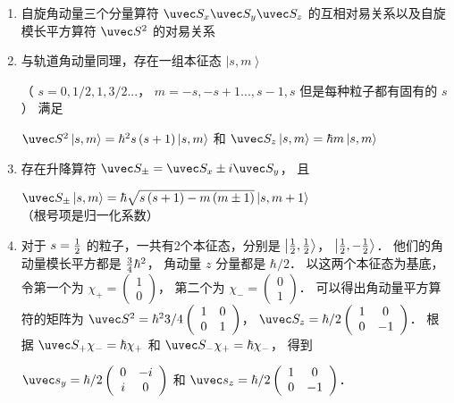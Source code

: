 
\begin{enumerate}
\item 自旋角动量三个分量算符 ${\uvec S_x}{\uvec S_y}{\uvec S_z}$ 的互相对易关系以及自旋模长平方算符 ${\uvec S^2}$ 的对易关系 %
\item 与轨道角动量同理，存在一组本征态 $\left| {s,m} \right\rangle $ 

（ $s = 0,{1}/{2},1,{3}/{2}...$， $m =  - s, - s + 1...,s - 1,s$ 但是每种粒子都有固有的 $s$ ） 满足

 ${\uvec S^2}\left| {s,m} \right\rangle  = {\hbar ^2}s\left( {s + 1} \right)\left| {s,m} \right\rangle $ 和 ${\uvec S_z}\left| {s,m} \right\rangle  = \hbar m\left| {s,m} \right\rangle $
\item 存在升降算符 ${\uvec S_ \pm } = {\uvec S_x} \pm i{\uvec S_y}$， 且

 ${\uvec S_ \pm }\left| {s,m} \right\rangle  = \hbar \sqrt {s\left( {s + 1} \right) - m\left( {m \pm 1} \right)} \left| {s,m + 1} \right\rangle $ （根号项是归一化系数）
\item 对于 $s = {\textstyle{1 \over 2}}$ 的粒子，一共有2个本征态，分别是 $\left| {{\textstyle{1 \over 2}},{\textstyle{1 \over 2}}} \right\rangle $，  $\left| {{\textstyle{1 \over 2}}, - {\textstyle{1 \over 2}}} \right\rangle $． 他们的角动量模长平方都是 ${\textstyle{3 \over 4}}{\hbar ^2}$， 角动量 $z$ 分量都是 ${\hbar }/{2}$．  以这两个本征态为基底，令第一个为  ${\chi _ + } = \left( {\begin{array}{*{20}{c}}
1\\
0
\end{array}} \right)$， 第二个为 ${\chi _ - } = \left( \begin{array}{l}
0\\
1
\end{array} \right)$． 可以得出角动量平方算符的矩阵为 ${\uvec S^2} = {\hbar ^2}{3}/{4}\left( {\begin{array}{*{20}{c}}
1&0\\
0&1
\end{array}} \right)$，   ${\uvec S_z} = {\hbar }/{2}\left( {\begin{array}{*{20}{c}}
1&0\\
0&{ - 1}
\end{array}} \right)$． 根据 ${\uvec S_ + }{\chi _ - } = \hbar {\chi _ + }$ 和 ${\uvec S_ - }{\chi _ + } = \hbar {\chi _ - }$，   得到

 ${\uvec s_y} = {\hbar }/{2}\left( {\begin{array}{*{20}{c}}
0&{ - i}\\
i&0
\end{array}} \right)$ 和 ${\uvec s_z} = {\hbar }/{2}\left( {\begin{array}{*{20}{c}}
1&0\\
0&{ - 1}
\end{array}} \right)$． 


\end{enumerate}
